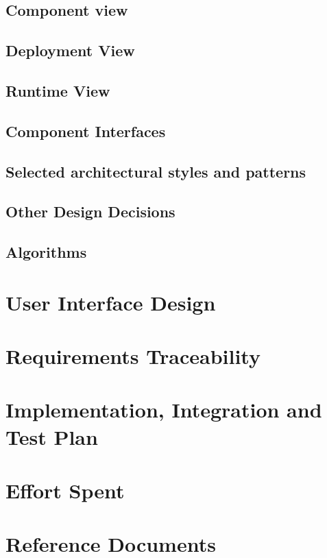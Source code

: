 \documentclass{article}
\begin{document}
\subsection{Component view}
\subsection{Deployment View}
\subsection{Runtime View}
\subsection{Component Interfaces}
\subsection{Selected architectural styles and patterns}
\subsection{Other Design Decisions}
\subsection{Algorithms}

\section{User Interface Design}

\section{Requirements Traceability}

\section{Implementation, Integration and Test Plan}

\section{Effort Spent}

\section{Reference Documents}
\end{document}
